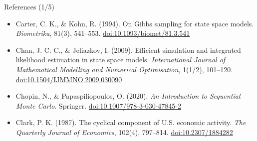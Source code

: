 \begin{frame}{References (1/5)}
\begin{itemize}
    \item Carter, C. K., \& Kohn, R. (1994). On Gibbs sampling for state space models. \textit{Biometrika}, 81(3), 541--553. \href{https://doi.org/10.1093/biomet/81.3.541}{doi:10.1093/biomet/81.3.541}
    \item Chan, J. C. C., \& Jeliazkov, I. (2009). Efficient simulation and integrated likelihood estimation in state space models. \textit{International Journal of Mathematical Modelling and Numerical Optimisation}, 1(1/2), 101--120. \href{https://doi.org/10.1504/IJMMNO.2009.030090}{doi:10.1504/IJMMNO.2009.030090}
    \item Chopin, N., \& Papaspiliopoulos, O. (2020). \textit{An Introduction to Sequential Monte Carlo}. Springer. \href{https://doi.org/10.1007/978-3-030-47845-2}{doi:10.1007/978-3-030-47845-2}
    \item Clark, P. K. (1987). The cyclical component of U.S. economic activity. \textit{The Quarterly Journal of Economics}, 102(4), 797--814. \href{https://doi.org/10.2307/1884282}{doi:10.2307/1884282}
\end{itemize}
\end{frame}

